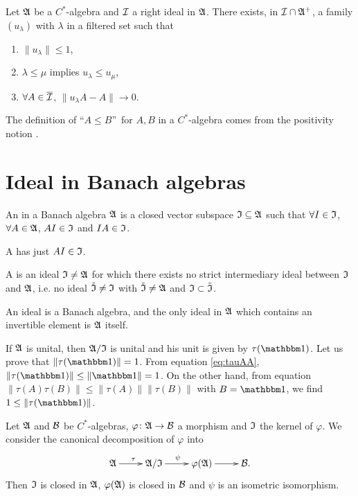 \begin{proposition}
Let $\mathfrak{A}$ be a $C^{*}$-algebra and $\mathcal{I}$ a right ideal in $\mathfrak{A}$. There exists, in $\mathcal{I}\cap\mathfrak{A}^+$, a family $(u_{\lambda})$ with $\lambda$ in a filtered set such that
\begin{enumerate}
\item $\|u_{\lambda}\|\leq 1$,
\item $\lambda\leq\mu$ implies $u_{\lambda}\leq u_{\mu}$,
\item $\forall A\in\overline{\mathcal{I}}$, $\|u_{\lambda} A-A\|\to 0$.
\end{enumerate}
\end{proposition}

The definition of ``$A\leq B$''\ for $A,B$ in a $C^{*}$-algebra comes from the positivity notion .


\section{Ideal in Banach algebras}

\begin{definition}
An  in a Banach algebra $\mathfrak{A}$ is a closed vector subspace $\mathfrak{I}\subseteq\mathfrak{A}$ such that $\forall I\in\mathfrak{I}$, $\forall A\in\mathfrak{A}$, $AI\in\mathfrak{I}$ and $IA\in\mathfrak{I}$.

A  has just $AI\in\mathfrak{I}$.

A   is an ideal $\mathfrak{I}\neq\mathfrak{A}$ for which there exists no strict intermediary ideal between $\mathfrak{I}$ and $\mathfrak{A}$, i.e. no ideal $\tilde{\mathfrak{I}}\neq\mathfrak{I}$  with $\tilde{\mathfrak{I}}\neq\mathfrak{A}$ and $\mathfrak{I}\subset\tilde{\mathfrak{I}}$.
\end{definition}

An ideal is a Banach algebra, and the only ideal in $\mathfrak{A}$ which contains an invertible element is $\mathfrak{A}$ itself.

If $\mathfrak{A}$ is unital, then $\mathfrak{A}/\mathfrak{I}$ is unital and his unit is given by $\tau(\cun)$. Let us prove that $\|\tau(\cun)\|=1$. From equation \eqref{eq:tauAA}, $\|\tau(\cun)\|\leq\|\cun\|=1$. On the other hand, from equation $\|\tau(A)\tau(B)\|\leq\|\tau(A)\|\|\tau(B)\|$ with $B=\cun$, we find $1\leq\|\tau(\cun)\|$. 

\begin{corollary}
    Let $\mathfrak{A}$ and $\mathcal{B}$ be $C^*$-algebras, $\varphi\colon \mathfrak{A}\to \mathcal{B}$ a morphism and $\mathfrak{I}$ the kernel of $\varphi$. We consider the canonical decomposition of $\varphi$ into
    \begin{equation}
    \xymatrix{%
       \cA \ar[r]^{\tau}    & \cA/\cI\ar[r]^{\psi}  & \varphi(\cA)\ar[r]    & \cB.
    }
    \end{equation}
    Then $\mathfrak{I}$ is closed in $\mathfrak{A}$, $\varphi(\mathfrak{A})$ is closed in $\mathcal{B}$ and $\psi$ is an isometric isomorphism.
\end{corollary}

